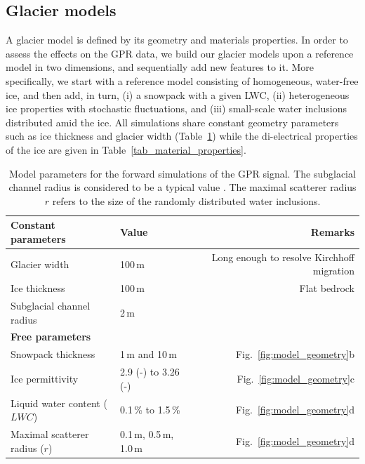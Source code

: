 \subsection{Glacier models}
\label{sec:glacier_materials}

A glacier model is defined by its geometry and materials properties. In order to assess the effects on the GPR data, we build our glacier models upon a reference model in two dimensions, and sequentially add new features to it. More specifically, we start with a reference model consisting of homogeneous, water-free ice, and then add, in turn, (i) a snowpack with a given LWC, (ii) heterogeneous ice properties with stochastic fluctuations, and (iii) small-scale water inclusions distributed amid the ice. All simulations share constant geometry parameters such as ice thickness and glacier width (Table~\ref{tab:simul_param}) while the di-electrical properties of the ice are given in Table~\ref{tab_material_properties}.

\begin{table}
    \centering
\caption{Model parameters for the forward simulations of the GPR signal. The subglacial channel radius is considered to be a typical value \citep{Fountain&Walder1998, Cuffey&Paterson2010}. The maximal scatterer radius $r$ refers to the size of the randomly distributed water inclusions.}
    \begin{tabular}{l l r}
         \hline
\textbf{Constant parameters}  & \textbf{Value} & \textbf{Remarks} \\
\hline
Glacier width & 100\,m & Long enough to resolve Kirchhoff migration\\
Ice thickness & 100\,m & Flat bedrock \\
Subglacial channel radius & 2\,m & \\
\hline
\textbf{Free parameters}  &  &  \\
\hline
Snowpack thickness & 1\,m and 10\,m & Fig.~\ref{fig:model_geometry}b\\
Ice permittivity & 2.9 (-) to 3.26 (-) & Fig.~\ref{fig:model_geometry}c\\
Liquid water content ($LWC$) & 0.1\,\% to 1.5\,\% & Fig.~\ref{fig:model_geometry}d \\
Maximal scatterer radius ($r$) & 0.1\,m, 0.5\,m, 1.0\,m & Fig.~\ref{fig:model_geometry}d\\
\hline
    \end{tabular}
\label{tab:simul_param}
\end{table}

